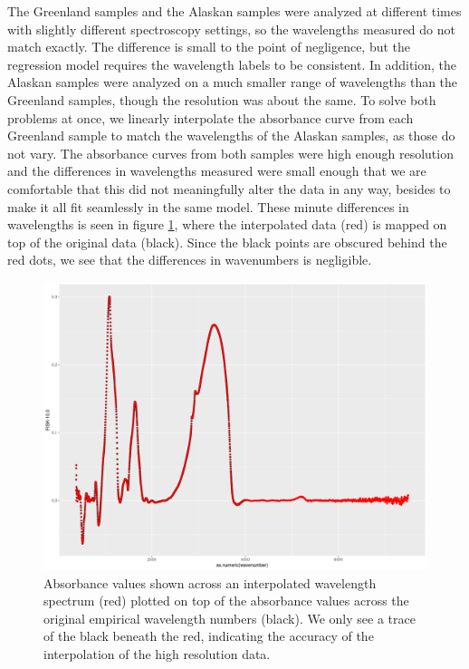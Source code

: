 \documentclass[water,article,submit,moreauthors,pdftex]{mdpi}
\begin{document}
The Greenland samples and the Alaskan samples were analyzed at different
times with slightly different spectroscopy settings, so the wavelengths
measured do not match exactly. The difference is small to the point of
negligence, but the regression model requires the wavelength labels to
be consistent. In addition, the Alaskan samples were analyzed on a much
smaller range of wavelengths than the Greenland samples, though the
resolution was about the same. To solve both problems at once, we
linearly interpolate the absorbance curve from each Greenland sample to
match the wavelengths of the Alaskan samples, as those do not vary. The
absorbance curves from both samples were high enough resolution and the
differences in wavelengths measured were small enough that we are
comfortable that this did not meaningfully alter the data in any way,
besides to make it all fit seamlessly in the same model. These minute
differences in wavelengths is seen in figure \ref{fig:fig4}, where the
interpolated data (red) is mapped on top of the original data (black).
Since the black points are obscured behind the red dots, we see that the
differences in wavenumbers is negligible.

\begin{figure}

{\centering \includegraphics[width=0.8\linewidth]{interpolation} 

}

\caption{Absorbance values shown across an interpolated wavelength spectrum (red) plotted on top of the absorbance values across the original empirical wavelength numbers (black). We only see a trace of the black beneath the red, indicating the accuracy of the interpolation of the high resolution data.}\label{fig:fig4}
\end{figure}
\end{document}
